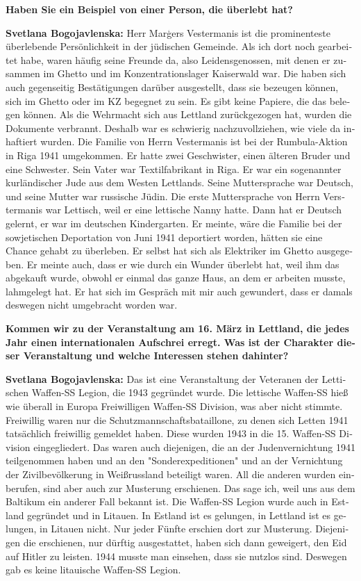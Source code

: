\begin{otherlanguage}{ngerman}
\textbf{Haben Sie ein Beispiel von einer Person, die überlebt hat?}

\textbf{Svetlana Bogojavlenska:} Herr Marģers Vestermanis ist die prominenteste überlebende Persönlichkeit in der jüdischen Gemeinde. Als ich dort noch gearbeitet habe, waren häufig seine Freunde da, also Leidensgenossen, mit denen er zusammen im Ghetto und im Konzentrationslager Kaiserwald war. Die haben sich auch gegenseitig Bestätigungen darüber ausgestellt, dass sie bezeugen können, sich im Ghetto oder im KZ begegnet zu sein. Es gibt keine Papiere, die das belegen können. Als die Wehrmacht sich aus Lettland zurückgezogen hat, wurden die Dokumente verbrannt. Deshalb war es schwierig nachzuvollziehen, wie viele da inhaftiert wurden. Die Familie von Herrn Vestermanis ist bei der Rumbula-Aktion in Riga 1941 umgekommen. Er hatte zwei Geschwister, einen älteren Bruder und eine Schwester. Sein Vater war Textilfabrikant in Riga. Er war ein sogenannter kurländischer Jude aus dem Westen Lettlands. Seine Muttersprache war Deutsch, und seine Mutter war russische Jüdin. Die erste Muttersprache von Herrn Verstermanis war Lettisch, weil er eine lettische Nanny hatte. Dann hat er Deutsch gelernt, er war im deutschen Kindergarten. Er meinte, wäre die Familie bei der sowjetischen Deportation von Juni 1941 deportiert worden, hätten sie eine Chance gehabt zu überleben. Er selbst hat sich als Elektriker im Ghetto ausgegeben. Er meinte auch, dass er wie durch ein Wunder überlebt hat, weil ihm das abgekauft wurde, obwohl er einmal das ganze Haus, an dem er arbeiten musste, lahmgelegt hat. Er hat sich im Gespräch mit mir auch gewundert, dass er damals deswegen nicht umgebracht worden war.

\textbf{Kommen wir zu der Veranstaltung am 16. März in Lettland, die jedes Jahr einen internationalen Aufschrei erregt. Was ist der Charakter dieser Veranstaltung und welche Interessen stehen dahinter?}

\textbf{Svetlana Bogojavlenska:} Das ist eine Veranstaltung der Veteranen der Lettischen Waffen-SS Legion, die 1943 gegründet wurde. Die lettische Waffen-SS hieß wie überall in Europa Freiwilligen Waffen-SS Division, was aber nicht stimmte. Freiwillig waren nur die Schutzmannschaftsbataillone, zu denen sich Letten 1941 tatsächlich freiwillig gemeldet haben. Diese wurden 1943 in die 15. Waffen-SS Division eingegliedert. Das waren auch diejenigen, die an der Judenvernichtung 1941 teilgenommen haben und an den "Sonderexpeditionen" und an der Vernichtung der Zivilbevölkerung in Weißrussland beteiligt waren. All die anderen wurden einberufen, sind aber auch zur Musterung erschienen. Das sage ich, weil uns aus dem Baltikum ein anderer Fall bekannt ist. Die Waffen-SS Legion wurde auch in Estland gegründet und in Litauen. In Estland ist es gelungen, in Lettland ist es gelungen, in Litauen nicht. Nur jeder Fünfte erschien dort zur Musterung. Diejenigen die erschienen, nur dürftig ausgestattet, haben sich dann geweigert, den Eid auf Hitler zu leisten. 1944 musste man einsehen, dass sie nutzlos sind. Deswegen gab es keine litauische Waffen-SS Legion. 


\end{otherlanguage}
